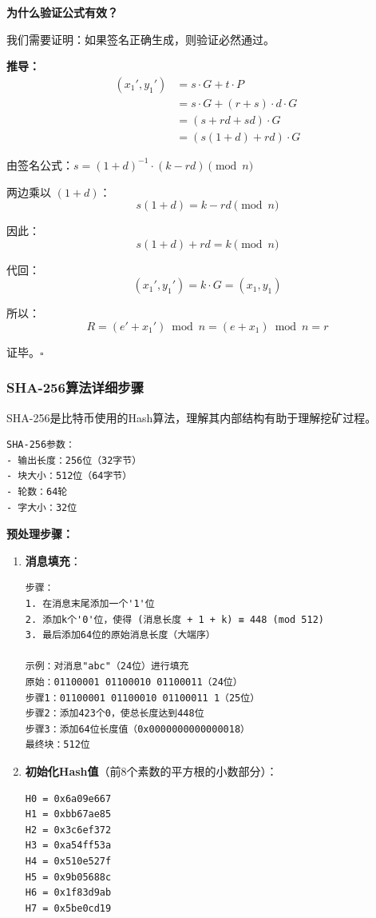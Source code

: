 ﻿\documentclass[12pt,a4paper]{article}
\begin{document}
\begin{examplebox}[签名验证的数学证明]
\textbf{为什么验证公式有效？}

我们需要证明：如果签名正确生成，则验证必然通过。

\textbf{推导：}
\begin{align*}
(x_1', y_1') &= s \cdot G + t \cdot P \\
&= s \cdot G + (r + s) \cdot d \cdot G \\
&= (s + rd + sd) \cdot G \\
&= (s(1+d) + rd) \cdot G
\end{align*}

由签名公式：$s = (1+d)^{-1} \cdot (k - rd) \pmod n$

两边乘以 $(1+d)$：
$$s(1+d) = k - rd \pmod n$$

因此：
$$s(1+d) + rd = k \pmod n$$

代回：
$$(x_1', y_1') = k \cdot G = (x_1, y_1)$$

所以：
$$R = (e' + x_1') \bmod n = (e + x_1) \bmod n = r$$

证毕。$\square$
\end{examplebox}

\subsubsection{SHA-256算法详细步骤}

SHA-256是比特币使用的Hash算法，理解其内部结构有助于理解挖矿过程。

\begin{lstlisting}
SHA-256参数：
- 输出长度：256位（32字节）
- 块大小：512位（64字节）
- 轮数：64轮
- 字大小：32位
\end{lstlisting}

\textbf{预处理步骤：}

\begin{enumerate}[leftmargin=1.5em]
\item \textbf{消息填充}：
\begin{lstlisting}
步骤：
1. 在消息末尾添加一个'1'位
2. 添加k个'0'位，使得 (消息长度 + 1 + k) ≡ 448 (mod 512)
3. 最后添加64位的原始消息长度（大端序）

示例：对消息"abc"（24位）进行填充
原始：01100001 01100010 01100011（24位）
步骤1：01100001 01100010 01100011 1（25位）
步骤2：添加423个0，使总长度达到448位
步骤3：添加64位长度值（0x0000000000000018）
最终块：512位
\end{lstlisting}

\item \textbf{初始化Hash值}（前8个素数的平方根的小数部分）：
\begin{lstlisting}
H0 = 0x6a09e667
H1 = 0xbb67ae85
H2 = 0x3c6ef372
H3 = 0xa54ff53a
H4 = 0x510e527f
H5 = 0x9b05688c
H6 = 0x1f83d9ab
H7 = 0x5be0cd19
\end{lstlisting}
\end{enumerate}
\end{document}
